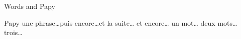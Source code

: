 \documentclass{article}
\begin{document}
\foreignlanguage{english}{Words\textellipsis{} and Papy\textellipsis}

\begin{minipage}{4cm}
Papy\textellipsis{} une phrase\ldots puis encore\ldots et la suite\ldots{} et encore\ldots{} un mot\ldots{} deux mots\ldots{} trois\ldots
\end{minipage}
\end{document}
